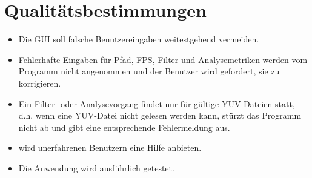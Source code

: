 \chapter{Qualitätsbestimmungen}

\begin{itemize}
\item Die GUI soll falsche Benutzereingaben weitestgehend vermeiden.
\item Fehlerhafte Eingaben für Pfad, FPS, Filter und Analysemetriken werden vom Programm nicht angenommen und der Benutzer wird gefordert, sie zu korrigieren.
\item Ein Filter- oder Analysevorgang findet nur für gültige YUV-Dateien statt, d.h. wenn eine YUV-Datei nicht gelesen werden kann, stürzt das Programm nicht ab und gibt eine entsprechende Fehlermeldung aus.
\item \projektTitel wird unerfahrenen Benutzern eine Hilfe anbieten.
\item Die Anwendung wird ausführlich getestet.
\end{itemize}
